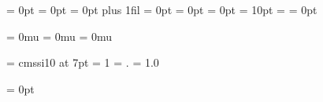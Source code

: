 
\leftskip = 0pt                 %
\lineskip = 0pt                 %
\zremovePlaindef \normalbaselineskip
{}   %
\zremovePlaindef \normallineskip
{}       %
\parfillskip = 0pt plus 1fil    %
\parskip = 0pt                  %
\rightskip = 0pt                %
\spaceskip = 0pt                %
\splittopskip = 10pt            %
\topskip = \mindimen            %
\xspaceskip = 0pt               %


\thinmuskip = 0mu               %
\medmuskip = 0mu                %
\thickmuskip = 0mu              %


\annotationfont = {cmssi10 at 7pt}
\baselinemultiplier = {1}
\decimalpoint = {.}
\matrixspread = {1.0}


\mathsurround = 0pt             %



\def \calculatetextareaheight #1{%
  \relax
  \if \dimnegp{\topskip}%
    \error{misstopskip}{The value of \string\topskip must be set}%
  \fi
  {\global\linesperpage = #1\relax
   \tcounta = #1\relax
   \decrement \tcounta
   \textareaheight = \the\tcounta\baselineskip
   \global\advance \textareaheight by \topskip
   \measurecapheight{\topdelta}%
   \measureascenderheight{\tdimena}%
   \if \dimgtrp{\tdimena}{\topdelta}\topdelta = \tdimena \fi
   \advance \topdelta by -\topskip
   \global\negate \topdelta}}


